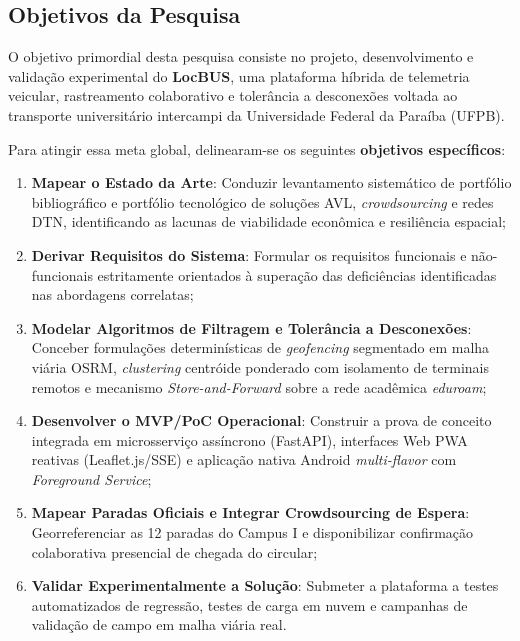 \documentclass[lettersize,journal]{IEEEtran}
\begin{document}
\subsection{Objetivos da Pesquisa}
O objetivo primordial desta pesquisa consiste no projeto, desenvolvimento e validação experimental do \textbf{LocBUS}, uma plataforma híbrida de telemetria veicular, rastreamento colaborativo e tolerância a desconexões voltada ao transporte universitário intercampi da Universidade Federal da Paraíba (UFPB).

Para atingir essa meta global, delinearam-se os seguintes \textbf{objetivos específicos}:
\begin{enumerate}
    \item \textbf{Mapear o Estado da Arte}: Conduzir levantamento sistemático de portfólio bibliográfico e portfólio tecnológico de soluções AVL, \textit{crowdsourcing} e redes DTN, identificando as lacunas de viabilidade econômica e resiliência espacial;
    \item \textbf{Derivar Requisitos do Sistema}: Formular os requisitos funcionais e não-funcionais estritamente orientados à superação das deficiências identificadas nas abordagens correlatas;
    \item \textbf{Modelar Algoritmos de Filtragem e Tolerância a Desconexões}: Conceber formulações determinísticas de \textit{geofencing} segmentado em malha viária OSRM, \textit{clustering} centróide ponderado com isolamento de terminais remotos e mecanismo \textit{Store-and-Forward} sobre a rede acadêmica \textit{eduroam};
    \item \textbf{Desenvolver o MVP/PoC Operacional}: Construir a prova de conceito integrada em microsserviço assíncrono (FastAPI), interfaces Web PWA reativas (Leaflet.js/SSE) e aplicação nativa Android \textit{multi-flavor} com \textit{Foreground Service};
    \item \textbf{Mapear Paradas Oficiais e Integrar Crowdsourcing de Espera}: Georreferenciar as 12 paradas do Campus I e disponibilizar confirmação colaborativa presencial de chegada do circular;
    \item \textbf{Validar Experimentalmente a Solução}: Submeter a plataforma a testes automatizados de regressão, testes de carga em nuvem e campanhas de validação de campo em malha viária real.
\end{enumerate}
\end{document}
